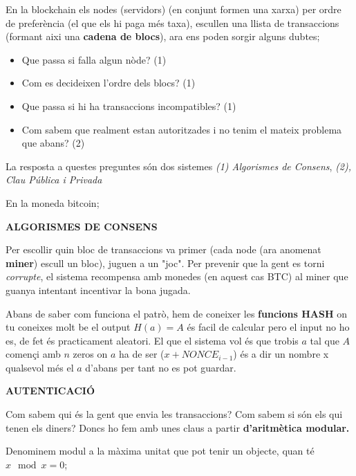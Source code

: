 \documentclass[12pt]{article}
\begin{document}
En la blockchain els nodes (servidors) (en conjunt formen una xarxa) per ordre de preferència (el que els hi paga més taxa), escullen una llista de transaccions (formant aixi una \textbf{cadena de blocs}), ara ens poden sorgir alguns dubtes;

\begin{itemize}
    \item Que passa si falla algun nòde? (1)
    \item Com es decideixen l'ordre dels blocs? (1)
    \item Que passa si hi ha transaccions incompatibles? (1)
    \item Com sabem que realment estan autoritzades i no tenim el mateix problema que abans? (2)
\end{itemize}

La resposta a questes preguntes són dos sistemes \textit{(1) Algorismes de Consens}, \textit{(2), Clau Pública i Privada}

En la moneda bitcoin;

\textbf{ALGORISMES DE CONSENS}

Per escollir quin bloc de transaccions va primer (cada node (ara anomenat \textbf{miner}) escull un bloc), juguen a un "joc". Per prevenir que la gent es torni \textit{corrupte}, el sistema recompensa amb monedes (en aquest cas BTC) al miner que guanya intentant incentivar la bona jugada.

Abans de saber com funciona el patrò, hem de coneixer les \textbf{funcions HASH} on tu coneixes molt be el output $H(a) = A$ és facil de calcular pero el input no ho es, de fet és practicament aleatori. El que el sistema vol és que trobis $a$ tal que $A$ començi amb $n$ zeros on $a$ ha de ser ($x + NONCE_{i-1}$) és a dir un nombre x qualsevol més el $a$ d'abans per tant no es pot guardar.

\textbf{AUTENTICACIÓ}

Com sabem qui és la gent que envia les transaccions? Com sabem si són els qui tenen els diners? Doncs ho fem amb unes claus a partir \textbf{d'aritmètica modular.}

Denominem modul a la màxima unitat que pot tenir un objecte, quan té $x \mod x = 0$;
\end{document}
